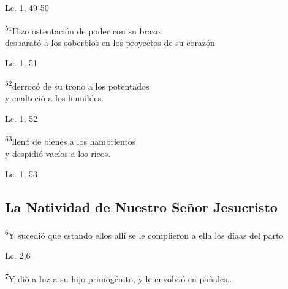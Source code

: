 \documentclass[a4paper,11pt,sans]{article}
\begin{document}
      \begin{center}
        Lc. 1, 49-50          
      \end{center}
      
      \begin{center}
        \textsuperscript{51}Hizo ostentación de poder con su brazo: \\
        desbarató a los soberbios en los proyectos de su corazón
      \end{center}

      \begin{center}
        Lc. 1, 51        
      \end{center}
      
      \begin{center}
        \textsuperscript{52}derrocó de su trono a los potentados \\
        y enalteció a los humildes.
      \end{center}

      \begin{center}
        Lc. 1, 52       
      \end{center}      
      
      \begin{center}
        \textsuperscript{53}llenó de bienes a los hambrientos \\
        y despidió vacíos a los ricos.
      \end{center}

      \begin{center}
        Lc. 1, 53        
      \end{center}
            
    \subsection*{\hfil La Natividad de Nuestro Señor Jesucristo \hfil}
      
      \begin{center}
        \textsuperscript{6}Y sucedió que estando ellos allí se le complieron a ella los díaas del parto
      \end{center}

      \begin{center}
        Lc. 2,6        
      \end{center}
      
      \begin{center}
        \textsuperscript{7}Y dió a luz a su hijo primogénito, y le envolvió en pañales...
      \end{center}
\end{document}
